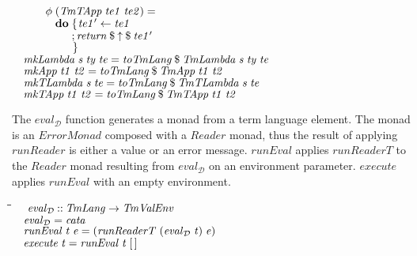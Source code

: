 \documentclass[10pt]{article}
\newlength{\lwidth}\setlength{\lwidth}{4.5cm}
\newlength{\cwidth}\setlength{\cwidth}{8mm} %
\newcommand{\Conid}[1]{\mathit{#1}}
\newcommand{\Varid}[1]{\mathit{#1}}
\begin{document}
\begin{tabbing}
${}$\\
${\hskip1.00em\relax\hskip2.00em\relax\Varid{\phi}\;(\Conid{TmTApp}\;\Varid{te1}\;\Varid{te2})\mathrel{=}}$\\
${\hskip1.00em\relax\hskip2.00em\relax\phantom{\Varid{\phi}\;\mbox{}}\mathbf{do}\;\{\mskip1.5mu \Varid{te1'}\leftarrow \Varid{te1}}$\\
${\hskip1.00em\relax\hskip2.00em\relax\phantom{\Varid{\phi}\;\mbox{}}\phantom{\mathbf{do}\;\mbox{}};\Varid{return}\mathbin{\$}\Varid{\uparrow}\mathbin{\$}\Varid{te1'}}$\\
${\hskip1.00em\relax\hskip2.00em\relax\phantom{\Varid{\phi}\;\mbox{}}\phantom{\mathbf{do}\;\mbox{}}\mskip1.5mu\}}$\\
${}$\\
${\hskip1.00em\relax\Varid{mkLambda}\;\Varid{s}\;\Varid{ty}\;\Varid{te}\mathrel{=}\Varid{toTmLang}\mathbin{\$}\Conid{TmLambda}\;\Varid{s}\;\Varid{ty}\;\Varid{te}}$\\
${\hskip1.00em\relax\Varid{mkApp}\;\Varid{t1}\;\Varid{t2}\mathrel{=}\Varid{toTmLang}\mathbin{\$}\Conid{TmApp}\;\Varid{t1}\;\Varid{t2}}$\\
${\hskip1.00em\relax\Varid{mkTLambda}\;\Varid{s}\;\Varid{te}\mathrel{=}\Varid{toTmLang}\mathbin{\$}\Conid{TmTLambda}\;\Varid{s}\;\Varid{te}}$\\
${\hskip1.00em\relax\Varid{mkTApp}\;\Varid{t1}\;\Varid{t2}\mathrel{=}\Varid{toTmLang}\mathbin{\$}\Conid{TmTApp}\;\Varid{t1}\;\Varid{t2}}$
\end{tabbing}
The \ensuremath{\Varid{eval}_{\mathcal D}} function generates a monad from a term language element.
The monad is an \ensuremath{\Conid{ErrorMonad}} composed with a \ensuremath{\Conid{Reader}} monad, thus the
result of applying \ensuremath{\Varid{runReader}} is either a value or an error message.
\ensuremath{\Varid{runEval}} applies \ensuremath{\Varid{runReaderT}} to the \ensuremath{\Conid{Reader}} monad resulting from
\ensuremath{\Varid{eval}_{\mathcal D}} on an environment parameter.  \ensuremath{\Varid{execute}} applies \ensuremath{\Varid{runEval}} with
an empty environment.

\begin{tabbing}
\qquad\=\hspace{\lwidth}\=\hspace{\cwidth}\=\+\kill
${\hskip1.00em\relax\Varid{eval}_{\mathcal D}\mathbin{::}\Conid{TmLang}\to \Conid{TmValEnv}}$\\
${\hskip1.00em\relax\Varid{eval}_{\mathcal D}\mathrel{=}\Varid{cata}}$\\
${}$\\
${\hskip1.00em\relax\Varid{runEval}\;\Varid{t}\;\Varid{e}\mathrel{=}(\Varid{runReaderT}\;(\Varid{eval}_{\mathcal D}\;\Varid{t})\;\Varid{e})}$\\
${}$\\
${\hskip1.00em\relax\Varid{execute}\;\Varid{t}\mathrel{=}\Varid{runEval}\;\Varid{t}\;[\mskip1.5mu \mskip1.5mu]}$
\end{tabbing}
\end{document}
